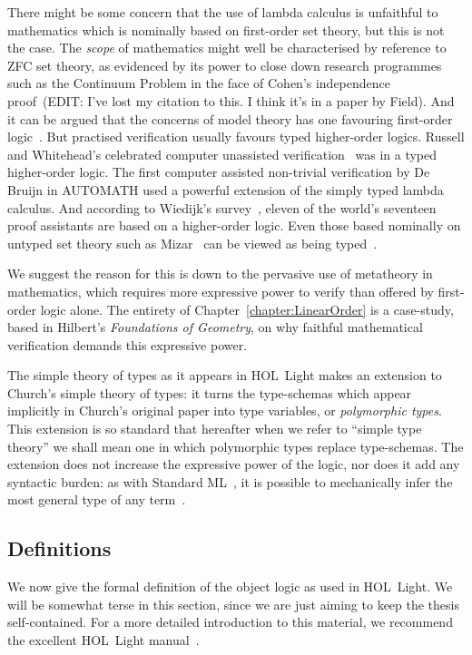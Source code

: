 There might be some concern that the use of lambda calculus is unfaithful to mathematics which is nominally based on first-order set theory, but this is not the case. The \emph{scope} of mathematics might well be characterised by reference to ZFC set theory, as evidenced by its power to close down research programmes such as the Continuum Problem in the face of Cohen's independence proof~(EDIT: I've lost my citation to this. I think it's in a paper by Field). And it can be argued that the concerns of model theory has one favouring first-order logic~\cite{LogicFirstOrder}. But practised verification usually favours typed higher-order logics. Russell and Whitehead's celebrated computer unassisted verification~\cite{Principia} was in a typed higher-order logic. The first computer assisted non-trivial verification by De Bruijn in AUTOMATH used a powerful extension of the simply typed lambda calculus. And according to Wiedijk's survey~\cite{SeventeenProvers}, eleven of the world's seventeen proof assistants are based on a higher-order logic. Even those based nominally on untyped set theory such as Mizar~\cite{MizarMathematicalVernacular} can be viewed as being typed~\cite{MizarSoftTypes}. 

We suggest the reason for this is down to the pervasive use of metatheory in mathematics, which requires more expressive power to verify than offered by first-order logic alone. The entirety of Chapter~\ref{chapter:LinearOrder} is a case-study, based in Hilbert's \emph{Foundations of Geometry}, on why faithful mathematical verification demands this expressive power.

The simple theory of types as it appears in HOL~Light makes an extension to Church's simple theory of types: it turns the type-schemas which appear implicitly in Church's original paper into type variables, or \emph{polymorphic types}. This extension is so standard that hereafter when we refer to ``simple type theory'' we shall mean one in which polymorphic types replace type-schemas. The extension does not increase the expressive power of the logic, nor does it add any syntactic burden: as with Standard ML~\cite{StandardML}, it is possible to mechanically infer the most general type of any term~\cite{HindleyMilner}.

\subsection{Definitions}\label{sec:ObjectLogicFormal}
We now give the formal definition of the object logic as used in HOL~Light. We will be somewhat terse in this section, since we are just aiming to keep the thesis self-contained. For a more detailed introduction to this material, we recommend the excellent HOL~Light manual~\cite{HOLLightManual}.


